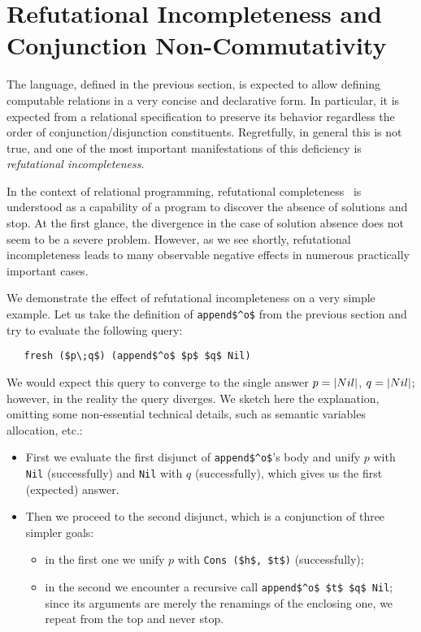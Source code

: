 \section{Refutational Incompleteness and Conjunction Non-Commutativity}
\label{incompleteness}

The language, defined in the previous section, is expected to allow defining computable relations in a 
very concise and declarative form. In particular, it is expected from a relational 
specification to preserve its behavior regardless the order of conjunction/disjunction 
constituents. Regretfully, in general this is not true, and one of the most important
manifestations of this deficiency is \emph{refutational incompleteness}.  

In the context of relational programming, refutational completeness~\cite{WillThesis} is understood as 
a capability of a program to discover the absence of solutions and stop. At the first glance,
the divergence in the case of solution absence does not seem to be a severe problem. However, as
we see shortly, refutational incompleteness leads to many observable negative effects in numerous
practically important cases. 

We demonstrate the effect of refutational incompleteness on a very simple example. Let us take the
definition of \lstinline{append$^o$} from the previous section and try to evaluate the following query:

\begin{lstlisting}
   fresh ($p\;q$) (append$^o$ $p$ $q$ Nil)
\end{lstlisting}

We would expect this query to converge to the single answer \mbox{$p=\lstinline|Nil|$}, \mbox{$q=\lstinline|Nil|$};
however, in the reality the query diverges. We sketch here the explanation, omitting some non-essential technical
details, such as semantic variables allocation, etc.:

\begin{itemize}
\item First we evaluate the first disjunct of \lstinline|append$^o$|'s body and unify $p$ with \lstinline|Nil| (successfully)
and \lstinline|Nil| with $q$ (successfully), which gives us the first (expected) answer.

\item Then we proceed to the second disjunct, which is a conjunction of three simpler goals:

  \begin{itemize} 
     \item in the first one we unify $p$ with \lstinline|Cons ($h$, $t$)| (successfully);
     \item in the second we encounter a recursive call \lstinline|append$^o$ $t$ $q$ Nil|; since its arguments are merely the renamings of the enclosing one, we repeat from the top and never stop.
  \end{itemize} 
\end{itemize}

